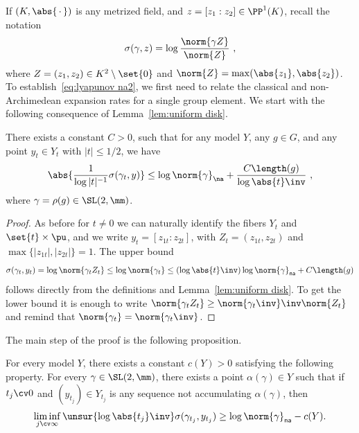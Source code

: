 If $(K, \abs{{\,\cdot\,}})$ is any metrized field, and $z =[z_1:z_2]\in \PP^1(K)$, recall the notation
\[
\sigma(\gamma, z) = \log \frac{\norm{\gamma Z}}{\norm{Z}}~,
\]
where $Z=(z_1, z_2)\in K^2\setminus\set{0}$ and $\norm{Z} = \max(\abs{z_1}, \abs{z_2})$. To establish~\eqref{eq:lyapunov na2}, we first need to relate the classical and non-Archimedean expansion rates for a single group element. We start with the following consequence of Lemma~\ref{lem:uniform disk}.

\begin{lemm}\label{lem:sup2}
There exists a constant $C>0$, such that for any model $Y$, any $g\in G$, and any point $y_{t}\in Y_{t}$ with $|t|\le 1/2$, we have
\begin{equation}\label{eq:sup2}
\abs{\frac{1}{\log|t|^{-1}} \sigma(\gamma_t, y)}
\leq
\log \norm{\gamma}_\na + \frac{C \length (g)}{\log\abs{t}\inv}~,
\end{equation}
where $\gamma = \rho(g) \in \SL(2,\mm)$.
\end{lemm}

\begin{proof}
As before for $t\neq 0$ we can naturally identify the fibers $Y_t$ and $\set{t}\times \pu$, and we write $y_t = [z_{1t}:z_{2t}]$, with $Z_t = (z_{1t}, z_{2t})$ and $\max\{ |z_{1t}|, |z_{2t}|\} =1$. The upper bound
\[
\sigma(\gamma_t, y_{t}) = \log\norm{\gamma_t Z_t} \leq \log\norm{\gamma_t} \le
(\log\abs{t}\inv) \log\norm{\gamma}_{\sf na} + C \length (g)
\]
follows directly from the definitions and Lemma~\ref{lem:uniform disk}. To get the lower bound it is enough to write $ \norm{\gamma_t Z_t} \geq \norm{\gamma_t\inv}\inv \norm{Z_t}$ and remind that $\norm{\gamma_t} = \norm{\gamma_t\inv}$.
\end{proof}

The main step of the proof is the following proposition.

\begin{prop}\label{prop:hybrid}
For every model $Y$, there exists a constant $c(Y)>0$ satisfying the following property. For every $\gamma \in \SL(2, \mm)$, there exists a point $\alpha(\gamma)\in Y$ such that if $t_j\cv0$ and $(y_{t_j})\in Y_{t_j}$ is any sequence not accumulating $\alpha(\gamma)$, then
\begin{equation}\label{eq:norm}
\liminf_{j\cv\infty} \unsur{\log\abs{t_j}\inv} \sigma(\gamma_{t_j}, y_{t_j}) \geq \log\norm{\gamma}_{\sf na} - c(Y).
\end{equation}
\end{prop}

